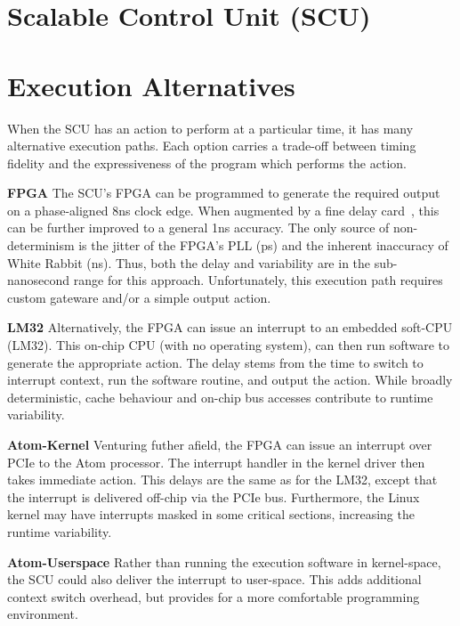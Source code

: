 \documentclass{JAC2003}
\begin{document}
\section{Scalable Control Unit (SCU)}


\section{Execution Alternatives}
When the SCU has an action to perform at a particular time, 
it has many alternative execution paths.
Each option carries a trade-off between timing fidelity and 
the expressiveness of the program which performs the action.

\textbf{FPGA} 
The SCU's FPGA can be programmed to generate the required output
on a phase-aligned 8ns clock edge. 
When augmented by a fine delay card~\cite{cern-fine-delay},
this can be further improved to a general 1ns accuracy.
The only source of non-determinism is the jitter of the FPGA's PLL (ps) 
and the inherent inaccuracy of White Rabbit (ns).
Thus, both the delay and variability are in the sub-nanosecond range 
for this approach.
Unfortunately, this execution path requires custom gateware and/or
a simple output action.

\textbf{LM32} 
Alternatively, the FPGA can issue an interrupt to an embedded soft-CPU (LM32).
This on-chip CPU (with no operating system), 
can then run software to generate the appropriate action.
The delay stems from the time to switch to interrupt context,
run the software routine,
and output the action.
While broadly deterministic,
cache behaviour and on-chip bus accesses contribute to runtime variability.

\textbf{Atom-Kernel}
Venturing futher afield,
the FPGA can issue an interrupt over PCIe to the Atom processor.
The interrupt handler in the kernel driver then takes immediate action.
This delays are the same as for the LM32, 
except that the interrupt is delivered off-chip via the PCIe bus.
Furthermore, 
the Linux kernel may have interrupts masked in some critical sections,
increasing the runtime variability.

\textbf{Atom-Userspace}
Rather than running the execution software in kernel-space,
the SCU could also deliver the interrupt to user-space.
This adds additional context switch overhead, 
but provides for a more comfortable programming environment.
\end{document}
